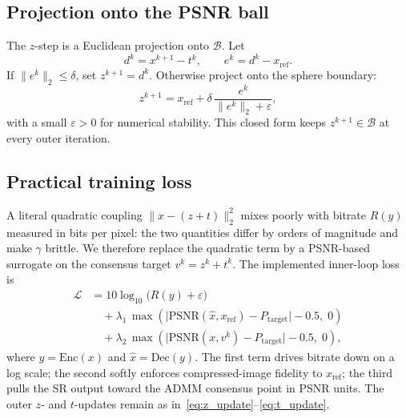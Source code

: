 \subsection{Projection onto the PSNR ball}

The \(z\)-step is a Euclidean projection onto \(\mathcal{B}\). Let
\begin{equation}
  d^{k} = x^{k+1} - t^{k},
  \qquad
  e^{k} = d^{k} - x_{\mathrm{ref}}.
\end{equation}
If \(\|e^{k}\|_2 \le \delta\), set \(z^{k+1} = d^{k}\). Otherwise project onto
the sphere boundary:
\begin{equation}
  z^{k+1}
  = x_{\mathrm{ref}} + \delta\,\frac{e^{k}}{\|e^{k}\|_2 + \varepsilon},
  \label{eq:projection_step}
\end{equation}
with a small \(\varepsilon>0\) for numerical stability. This closed form keeps
\(z^{k+1}\in\mathcal{B}\) at every outer iteration.

\subsection{Practical training loss}

A literal quadratic coupling \(\|x-(z+t)\|_2^2\) mixes poorly with bitrate
\(R(y)\) measured in bits per pixel: the two quantities differ by orders of
magnitude and make \(\gamma\) brittle. We therefore replace the quadratic term
by a PSNR-based surrogate on the consensus target \(v^{k}=z^{k}+t^{k}\). The
implemented inner-loop loss is
\begin{equation}
  \begin{aligned}
    \mathcal{L}
    &= 10\log_{10}\!\bigl(R(y)+\varepsilon\bigr) \\
    &\quad
      + \lambda_1\,\max\!\left(
          \bigl|\mathrm{PSNR}(\hat{x}, x_{\mathrm{ref}}) - P_{\mathrm{target}}\bigr|
          - 0.5,\; 0
        \right) \\
    &\quad
      + \lambda_2\,\max\!\left(
          \bigl|\mathrm{PSNR}(x, v^{k}) - P_{\mathrm{target}}\bigr|
          - 0.5,\; 0
        \right),
  \end{aligned}
  \label{eq:training_loss}
\end{equation}
where \(y=\mathrm{Enc}(x)\) and \(\hat{x}=\mathrm{Dec}(y)\). The first term
drives bitrate down on a log scale; the second softly enforces compressed-image
fidelity to \(x_{\mathrm{ref}}\); the third pulls the SR output toward the ADMM
consensus point in PSNR units. The outer \(z\)- and \(t\)-updates remain as
in~\eqref{eq:z_update}--\eqref{eq:t_update}.

